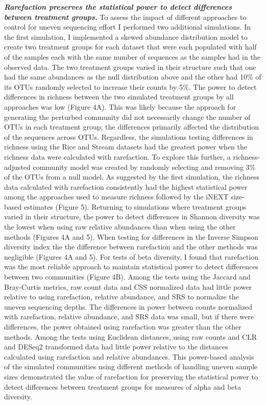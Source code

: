 \documentclass[
]{article}
\begin{document}
\textbf{\emph{Rarefaction preserves the statistical power to detect
differences between treatment groups.}} To assess the impact of
different approaches to control for uneven sequencing effort I performed
two additional simulations. In the first simulation, I implemented a
skewed abundance distribution model to create two treatment groups for
each dataset that were each populated with half of the samples each with
the same number of sequences as the samples had in the observed data.
The two treatment groups varied in their structure such that one had the
same abundances as the null distribution above and the other had 10\% of
its OTUs randomly selected to increase their counts by 5\%. The power to
detect differences in richness between the two simulated treatment
groups by all approaches was low (Figure 4A). This was likely because
the approach for generating the perturbed community did not necessarily
change the number of OTUs in each treatment group; the differences
primarily affected the distribution of the sequences across OTUs.
Regardless, the simulations testing differences in richness using the
Rice and Stream datasets had the greatest power when the richness data
were calculated with rarefaction. To explore this further, a
richness-adjusted community model was created by randomly selecting and
removing 3\% of the OTUs from a null model. As suggested by the first
simulation, the richness data calculated with rarefaction consistently
had the highest statistical power among the approaches used to measure
richness followed by the iNEXT size-based estimates (Figure 5).
Returning to simulations where treatment groups varied in their
structure, the power to detect differences in Shannon diversity was the
lowest when using raw relative abundances than when using the other
methods (Figures 4A and 5). When testing for differences in the Inverse
Simpson diversity index the the difference between rarefaction and the
other methods was negligible (Figures 4A and 5). For tests of beta
diversity, I found that rarefaction was the most reliable approach to
maintain statistical power to detect differences between two communities
(Figure 4B). Among the tests using the Jaccard and Bray-Curtis metrics,
raw count data and CSS normalized data had little power relative to
using rarefaction, relative abundance, and SRS to normalize the uneven
sequencing depths. The differences in power between counts normalized
with rarefaction, relative abundance, and SRS data was small, but if
there were differences, the power obtained using rarefaction was greater
than the other methods. Among the tests using Euclidean distances, using
raw counts and CLR and DESeq2 transformed data had little power relative
to the distances calculated using rarefaction and relative abundances.
This power-based analysis of the simulated communities using different
methods of handling uneven sample sizes demonstrated the value of
rarefaction for preserving the statistical power to detect differences
between treatment groups for measures of alpha and beta diversity.
\end{document}
